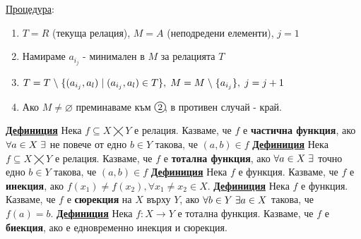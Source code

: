 \documentclass{article}
\begin{document}
\underline{Процедура}: \begin{enumerate}[label=\protect\circled{\arabic*}]
    \item $T = R$ (текуща релация), $M = A$ (неподредени елементи), $j = 1$
    \item Намираме $a_{i_j}$ - минимален в $M$ за релацията $T$
    \item $T = T \hspace{0.1cm} \backslash \hspace{0.1cm} \{(a_{i_j}, a_l) \hspace{0.1cm} | \hspace{0.1cm} (a_{i_j}, a_l) \in T\}, \hspace{0.1cm} M = M \hspace{0.1cm}
    \backslash \hspace{0.1cm} \{a_{i_j}\}, \hspace{0.1cm} j = j + 1$
    \item Ако $M \neq \varnothing$ преминаваме към $\circled{2}$, в противен случай - край.
\end{enumerate}
\textbf{\underline{Дефиниция}}
Нека $f \subseteq X \bigtimes Y$ е релация. Казваме, че $f$ е \textbf{частична функция}, ако $\forall a \in X \hspace{0.1cm} \exists$ не повече от 
едно $b \in Y$ такова, че $(a, b) \in f$ \newline\newline
\textbf{\underline{Дефиниция}}
Нека $f \subseteq X \bigtimes Y$ е релация. Казваме, че $f$ е \textbf{тотална функция}, ако $\forall a \in X \hspace{0.1cm} \exists$ точно
едно $b \in Y$ такова, че $(a, b) \in f$ \newline\newline
\textbf{\underline{Дефиниция}}
Нека $f$ е функция. Казваме, че $f$ е \textbf{инекция}, ако $f(x_1) \neq f(x_2), \forall x_1 \neq x_2 \in X$. \newline\newline
\textbf{\underline{Дефиниция}}
Нека $f$ е функция. Казваме, че $f$ е \textbf{сюрекция} на $X$ върху $Y$, ако $\forall b \in Y \hspace{0.1cm} \exists a \in X$ такова, че $f(a) = b$. \newline\newline
\textbf{\underline{Дефиниция}}
Нека $f : X \rightarrow Y$  е тотална функция. Казваме, че $f$ е \textbf{биекция}, ако е едновременно инекция и сюрекция. \newline\newline
\end{document}
